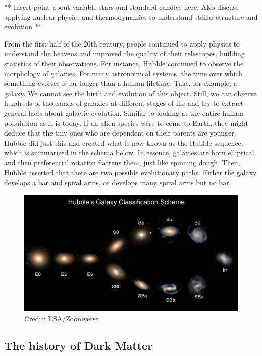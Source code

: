 ** Insert point about variable stars and standard candles here. Also discuss applying nuclear physics and thermodynamics to understand stellar structure and evolution ** 

From the first half of the 20th century, people continued to apply physics to understand the heavens and improved the quality of their telescopes, building statistics of their observations. For instance, Hubble continued to observe the morphology of galaxies. For many astronomical systems, the time over which something evolves is far longer than a human lifetime. Take, for example, a galaxy. We cannot see the birth and evolution of this object. Still, we can observe hundreds of thousands of galaxies at different stages of life and try to extract general facts about galactic evolution. Similar to looking at the entire human population as it is today. If an alien species were to come to Earth, they might deduce that the tiny ones who are dependent on their parents are younger. Hubble did just this and created what is now known as the Hubble sequence, which is summarized in the schema below. In essence, galaxies are born elliptical, and then preferential rotation flattens them, just like spinning dough. Then, Hubble asserted that there are two possible evolutionary paths. Either the galaxy develops a bar and spiral arms, or develops many spiral arms but no bar. 


\begin{figure}
    \centering
    \includegraphics[width=\linewidth]{images/hubble-sequence.jpg}
    \caption{Credit: ESA/Zooniverse}
    \label{fig:Hubble_Tuning_Fork_diagram}
\end{figure}


\subsection{The history of Dark Matter}

